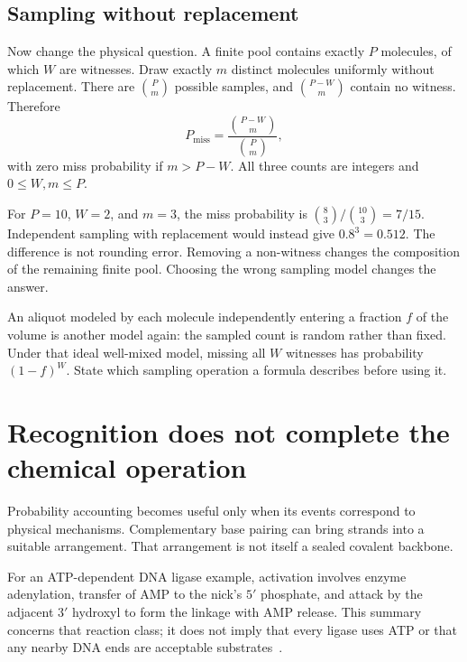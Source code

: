 \subsection{Sampling without replacement}

Now change the physical question. A finite pool contains exactly $P$ molecules, of which $W$ are witnesses. Draw exactly $m$ distinct molecules uniformly without replacement. There are $\binom{P}{m}$ possible samples, and $\binom{P-W}{m}$ contain no witness. Therefore
\begin{equation}
P_{\mathrm{miss}}=\frac{\binom{P-W}{m}}{\binom{P}{m}}, \label{eq:finite}
\end{equation}
with zero miss probability if $m>P-W$. All three counts are integers and $0\leq W,m\leq P$.

For $P=10$, $W=2$, and $m=3$, the miss probability is $\binom83/\binom{10}3=7/15$. Independent sampling with replacement would instead give $0.8^3=0.512$. The difference is not rounding error. Removing a non-witness changes the composition of the remaining finite pool. Choosing the wrong sampling model changes the answer.

An aliquot modeled by each molecule independently entering a fraction $f$ of the volume is another model again: the sampled count is random rather than fixed. Under that ideal well-mixed model, missing all $W$ witnesses has probability $(1-f)^W$. State which sampling operation a formula describes before using it.

\section{Recognition does not complete the chemical operation}

Probability accounting becomes useful only when its events correspond to physical mechanisms. Complementary base pairing can bring strands into a suitable arrangement. That arrangement is not itself a sealed covalent backbone.


For an ATP-dependent DNA ligase example, activation involves enzyme adenylation, transfer of AMP to the nick's $5'$ phosphate, and attack by the adjacent $3'$ hydroxyl to form the linkage with AMP release. This summary concerns that reaction class; it does not imply that every ligase uses ATP or that any nearby DNA ends are acceptable substrates~\cite{NEBLigation}.

